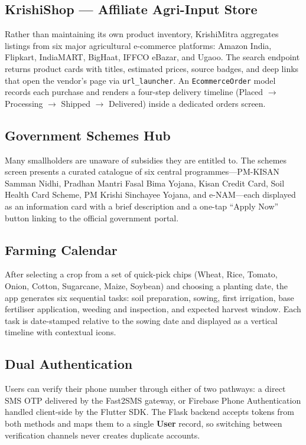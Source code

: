 \documentclass[conference]{IEEEtran}
\begin{document}
\subsection{KrishiShop --- Affiliate Agri-Input Store}
Rather than maintaining its own product
inventory, KrishiMitra aggregates listings from six major agricultural e-commerce platforms: Amazon
India, Flipkart, IndiaMART, BigHaat, IFFCO eBazar, and Ugaoo. The search endpoint returns product
cards with titles, estimated prices, source badges, and deep links that open the vendor's page via
\texttt{url\_launcher}. An \texttt{EcommerceOrder} model records each purchase and renders a
four-step delivery timeline (Placed $\rightarrow$ Processing $\rightarrow$ Shipped $\rightarrow$
Delivered) inside a dedicated orders screen.

\subsection{Government Schemes Hub}
Many smallholders are unaware of subsidies they are entitled to.
The schemes screen presents a curated catalogue of six central programmes---PM-KISAN Samman Nidhi,
Pradhan Mantri Fasal Bima Yojana, Kisan Credit Card, Soil Health Card Scheme, PM Krishi Sinchayee
Yojana, and e-NAM---each displayed as an information card with a brief description and a one-tap
``Apply Now'' button linking to the official government portal.

\subsection{Farming Calendar}
After selecting a crop from a set of quick-pick chips (Wheat, Rice,
Tomato, Onion, Cotton, Sugarcane, Maize, Soybean) and choosing a planting date, the app generates
six sequential tasks: soil preparation, sowing, first irrigation, base fertiliser application,
weeding and inspection, and expected harvest window. Each task is date-stamped relative to the
sowing date and displayed as a vertical timeline with contextual icons.

\subsection{Dual Authentication}
Users can verify their phone number through either of two pathways:
a direct SMS OTP delivered by the Fast2SMS gateway, or Firebase Phone
Authentication handled client-side by the Flutter SDK. The Flask backend
accepts tokens from both methods and maps them to a single \textbf{User}
record, so switching between verification channels never creates
duplicate accounts.
\end{document}
